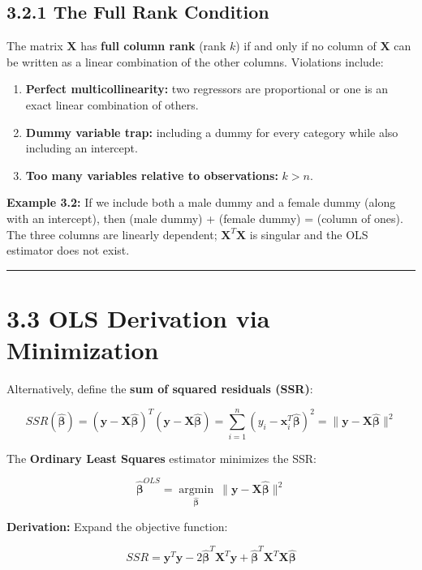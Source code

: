 \subsection{3.2.1 The Full Rank Condition}

The matrix $\mathbf{X}$ has \textbf{full column rank} (rank $k$) if and only if no column of $\mathbf{X}$ can be written as a linear combination of the other columns. Violations include:

\begin{enumerate}
\item \textbf{Perfect multicollinearity:} two regressors are proportional or one is an exact linear combination of others.
\item \textbf{Dummy variable trap:} including a dummy for every category while also including an intercept.
\item \textbf{Too many variables relative to observations:} $k > n$.
\end{enumerate}

\textbf{Example 3.2:} If we include both a male dummy and a female dummy (along with an intercept), then (male dummy) + (female dummy) = (column of ones). The three columns are linearly dependent; $\mathbf{X}^T \mathbf{X}$ is singular and the OLS estimator does not exist.

\medskip\hrule\medskip

\section{3.3 OLS Derivation via Minimization}

Alternatively, define the \textbf{sum of squared residuals (SSR)}:

\[
SSR(\hat{\boldsymbol{\beta}}) = (\mathbf{y} - \mathbf{X}\hat{\boldsymbol{\beta}})^T (\mathbf{y} - \mathbf{X}\hat{\boldsymbol{\beta}}) = \sum_{i=1}^n (y_i - \mathbf{x}_i^T \hat{\boldsymbol{\beta}})^2 = \|\mathbf{y} - \mathbf{X}\hat{\boldsymbol{\beta}}\|^2
\]

The \textbf{Ordinary Least Squares} estimator minimizes the SSR:

\[
\hat{\boldsymbol{\beta}}^{OLS} = \underset{\hat{\boldsymbol{\beta}}}{\operatorname{argmin}} \ \|\mathbf{y} - \mathbf{X}\hat{\boldsymbol{\beta}}\|^2
\]

\textbf{Derivation:} Expand the objective function:

\[
SSR = \mathbf{y}^T\mathbf{y} - 2\hat{\boldsymbol{\beta}}^T \mathbf{X}^T\mathbf{y} + \hat{\boldsymbol{\beta}}^T \mathbf{X}^T\mathbf{X} \hat{\boldsymbol{\beta}}
\]

